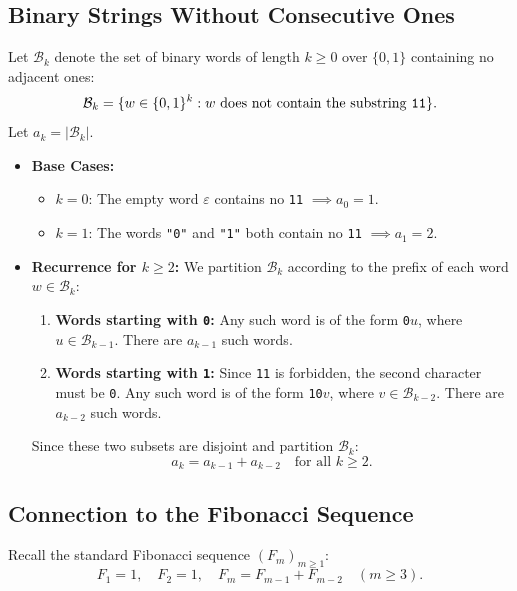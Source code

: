 ﻿\documentclass[a4paper]{article}
\begin{document}
\subsection{Binary Strings Without Consecutive Ones}
Let $\mathcal{B}_k$ denote the set of binary words of length $k \ge 0$ over $\{0, 1\}$ containing no adjacent ones:
\begin{equation}
\mathcal{B}_k = \{ w \in \{0, 1\}^k : w \text{ does not contain the substring \texttt{11}} \}.
\end{equation}
Let $a_k = |\mathcal{B}_k|$.

\begin{itemize}
    \item \textbf{Base Cases:}
    \begin{itemize}
        \item $k = 0$: The empty word $\varepsilon$ contains no \texttt{11} $\implies a_0 = 1$.
        \item $k = 1$: The words \texttt{"0"} and \texttt{"1"} both contain no \texttt{11} $\implies a_1 = 2$.
    \end{itemize}
    
    \item \textbf{Recurrence for $k \ge 2$:}
    We partition $\mathcal{B}_k$ according to the prefix of each word $w \in \mathcal{B}_k$:
    \begin{enumerate}
        \item \textbf{Words starting with \texttt{0}:} Any such word is of the form \texttt{0}$u$, where $u \in \mathcal{B}_{k-1}$. There are $a_{k-1}$ such words.
        \item \textbf{Words starting with \texttt{1}:} Since \texttt{11} is forbidden, the second character must be \texttt{0}. Any such word is of the form \texttt{10}$v$, where $v \in \mathcal{B}_{k-2}$. There are $a_{k-2}$ such words.
    \end{enumerate}
    Since these two subsets are disjoint and partition $\mathcal{B}_k$:
    \begin{equation}\label{eq:nim:fib_recurrence}
    a_k = a_{k-1} + a_{k-2} \quad \text{for all } k \ge 2.
    \end{equation}
\end{itemize}

\subsection{Connection to the Fibonacci Sequence}
Recall the standard Fibonacci sequence $(F_m)_{m \ge 1}$:
\begin{equation}
F_1 = 1, \quad F_2 = 1, \quad F_m = F_{m-1} + F_{m-2} \quad (m \ge 3).
\end{equation}
\end{document}
